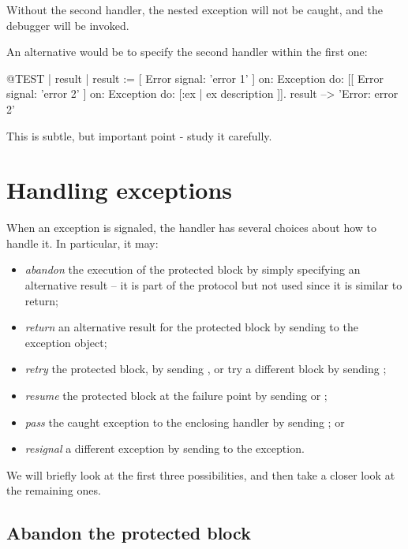Without the second handler, the nested exception will not be caught, and the debugger will be invoked.

An alternative would be to specify the second handler within the first one:
\begin{code}{@TEST | result |}
result := [ Error signal: 'error 1' ]
	on: Exception
	do: [[ Error signal: 'error 2' ]
		on: Exception
		do: [:ex | ex description ]].
result --> 'Error: error 2'
\end{code}

This is subtle, but important point -  study it carefully. 
\section{Handling exceptions}

When an exception is signaled, the handler has several choices about how to handle it.
In particular, it may:
\begin{itemize}
\item[(i)] \emph{abandon} the execution of the protected block by simply specifying an alternative result -- it is part of the protocol but not used since it is similar to return; 
\item[(ii)] \emph{return} an alternative result for the protected block by sending  to the exception object;
\item[(iii)] \emph{retry} the protected block, by sending , or try a different block by sending ;
\item[(iv)] \emph{resume} the protected block at the failure point by sending  or ;
\item[(v)] \emph{pass} the caught exception to the enclosing handler by sending ; or
\item[(vi)] \emph{resignal} a different exception by sending  to the exception.
\end{itemize}

We will briefly look at the first three possibilities, and then take a closer look at the remaining ones.

\subsection{Abandon the protected block}

